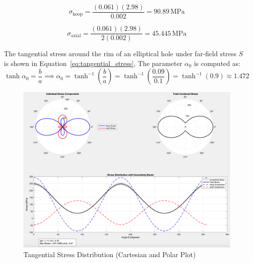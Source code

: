 \documentclass[a4paper,11pt]{article}
\begin{document}
\noindent
\begin{minipage}{0.45\textwidth}
\begin{equation}
\sigma_{\text{hoop}} = \frac{(0.061)(2.98)}{0.002} = 90.89 \, \text{MPa}
\end{equation}
\end{minipage}%
\hfill
\begin{minipage}{0.45\textwidth}
\begin{equation}
\sigma_{\text{axial}} = \frac{(0.061)(2.98)}{2(0.002)} = 45.445 \, \text{MPa}
\end{equation}
\end{minipage}
 
 
The tangential stress around the rim of an elliptical hole under far-field stress \( S \) is shown in Equation~\ref{eq:tangential_stress}, The parameter \( \alpha_0 \) is computed as:
\begin{equation}
\tanh \alpha_0 = \frac{b}{a} \implies \alpha_0 = \tanh^{-1}\left(\frac{b}{a}\right) = \tanh^{-1}\left(\frac{0.09}{0.1}\right) = \tanh^{-1}(0.9) \approx 1.472
\end{equation}
 


 
 
 
\begin{figure}[ht]
 
    \centering
 
        \includegraphics[width=\textwidth]{Screenshot 2025-01-03 at 22.49.55.png}
        \caption{Tangential Stress Distribution (Cartesian and Polar Plot)}
        \label{fig:stress_distribution_polar}
 
\end{figure}
\end{document}
